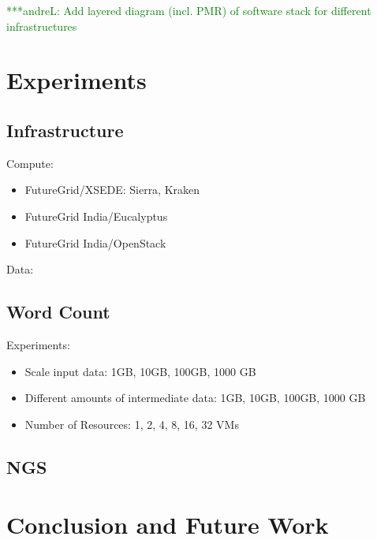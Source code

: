 \documentclass[times]{cpeauth}
\newcommand{\alnote}[1]{ {\textcolor{green} { ***andreL: #1 }}}
\newcommand{\alnote}[1]{}
\begin{document}
\alnote{Add layered diagram (incl. PMR) of software stack for different 
infrastructures}

\section{Experiments}

\subsection{Infrastructure}

Compute:
\begin{itemize}
	\item FutureGrid/XSEDE: Sierra, Kraken 
	\item FutureGrid India/Eucalyptus
	\item FutureGrid India/OpenStack
\end{itemize}

Data:

	
\subsection{Word Count}

Experiments:
\begin{itemize}
	\item  Scale input data: 1GB, 10GB, 100GB, 1000 GB
	\item  Different amounts of intermediate data: 1GB, 10GB, 100GB, 1000 GB
	\item  Number of Resources: 1, 2, 4, 8, 16, 32 VMs
\end{itemize}

\subsection{NGS}

\section{Conclusion and Future Work}



\end{document}
